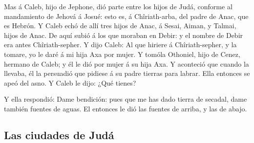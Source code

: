  Mas á Caleb, hijo de Jephone, dió parte entre los hijos
de Judá, conforme al mandamiento de Jehová á Josué: esto es, á
Chîriath-arba, del padre de Anac, que es Hebrón.  Y Caleb
echó de allí tres hijos de Anac, á Sesai, Aiman, y Talmai, hijos de
Anac.  De aquí subió á los que moraban en Debir: y el
nombre de Debir era antes Chîriath-sepher.  Y dijo Caleb:
Al que hiriere á Chîriath-sepher, y la tomare, yo le daré á mi hija Axa
por mujer.  Y tomóla Othoniel, hijo de Cenez, hermano de
Caleb; y él le dió por mujer á su hija Axa.  Y aconteció
que cuando la llevaba, él la persuadió que pidiese á su padre tierras
para labrar. Ella entonces se apeó del asno. Y Caleb le dijo: ¿Qué
tienes?

 Y ella respondió: Dame bendición: pues que me has dado
tierra de secadal, dame también fuentes de aguas. El entonces le dió las
fuentes de arriba, y las de abajo.

\hypertarget{las-ciudades-de-juduxe1}{%
\subsection{Las ciudades de Judá}\label{las-ciudades-de-juduxe1}}

